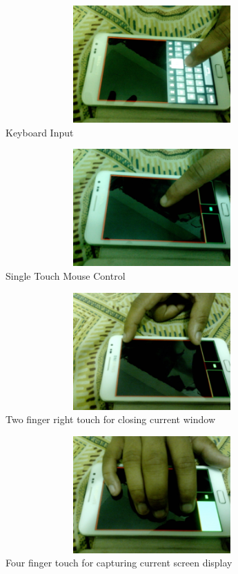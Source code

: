 \documentclass[10pt,conference,letterpaper]{IEEEtran}
\begin{document}
\begin{figure}
\centering
\includegraphics[width=120mm,height=45mm]{10.eps}
\caption{Keyboard Input}
\end{figure}
\begin{figure}
\centering
\includegraphics[width=120mm,height=45mm]{11.eps}
\caption{Single Touch Mouse Control}
\end{figure}
\begin{figure}
\centering
\includegraphics[width=120mm,height=45mm]{12.eps}
\caption{Two finger right touch for closing current window}
\end{figure}
\begin{figure}
\centering
\includegraphics[width=120mm,height=45mm]{13.eps}
\caption{Four finger touch for capturing current screen display}
\end{figure}
\end{document}
